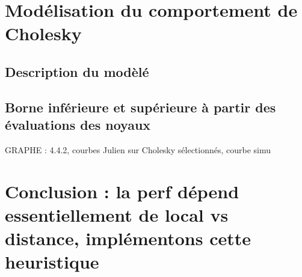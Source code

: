 \section{Modélisation du comportement de Cholesky}
\subsection{Description du modèlé}
\subsection{Borne inférieure et supérieure à partir des évaluations des noyaux}

GRAPHE : 4.4.2, courbes Julien sur Cholesky sélectionnés, courbe simu
\section{Conclusion : la perf dépend essentiellement de local vs distance, implémentons cette heuristique}
